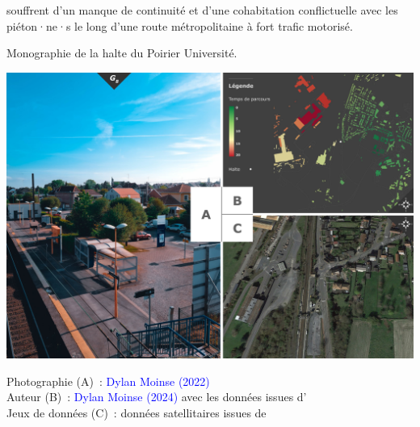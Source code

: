 \begin{refsegment}
souffrent d’un manque de continuité et d'une cohabitation conflictuelle avec les piéton·ne·s le long d’une route métropolitaine à fort trafic motorisé.%

        \begin{carte}[h!]\vspace*{4pt}
        \caption{Monographie de la halte du Poirier Université.}
        \label{fig-chap3:monographie-le-poirier}
        \centerline{\includegraphics[height=.35\pageheight]{src/Figures/Chap-3/FR_Gare_Poirier.jpg}}
        \vspace{5pt}
        \begin{flushright}\scriptsize{
        Photographie (A)~: \textcolor{blue}{Dylan Moinse (2022)}
        \\
        Auteur (B)~: \textcolor{blue}{Dylan Moinse (2024)} avec les données issues d'\textcolor{blue}{\textcite{openstreetmap_openstreetmap_2023}}
        \\
      Jeux de données (C)~: données satellitaires issues de \textcolor{blue}{\textcite{google_earth_google_2023}}
      }\end{flushright}
      \end{carte}


\end{refsegment}
